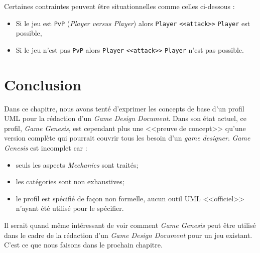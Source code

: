 
Certaines contraintes peuvent être situationnelles comme celles ci-dessous :
\begin{itemize}
    \item Si le jeu est \texttt{PvP} (\emph{Player versus Player}) alors \texttt{Player} \texttt{<<attack>>} \texttt{Player} est possible,
    \item Si le jeu n'est pas \texttt{PvP} alors \texttt{Player} \texttt{<<attack>>} \texttt{Player} n'est pas possible.
\end{itemize}



\section{Conclusion}
%
%
Dans ce chapitre, nous avons tenté d'exprimer les concepts de base d'un profil UML pour la rédaction d'un \emph{Game Design Document}.
Dans son état actuel, ce profil, \emph{Game Genesis}, est cependant plus une <<preuve de concept>> qu'une version complète qui pourrait couvrir tous les besoin d'un \emph{game designer}.
\emph{Game Genesis} est incomplet car :
\begin{itemize}
    \item seuls les aspects \emph{Mechanics} sont traités;
    \item les catégories sont non exhaustives;
    \item le profil est spécifié de façon non formelle, aucun outil UML <<officiel>> n'ayant été utilisé pour le spécifier.
\end{itemize}

Il serait quand même intéressant de voir comment \emph{Game Genesis} peut être utilisé dans le cadre de la rédaction d'un \emph{Game Design Document} pour un jeu existant.
C'est ce que nous faisons dans le prochain chapitre.




